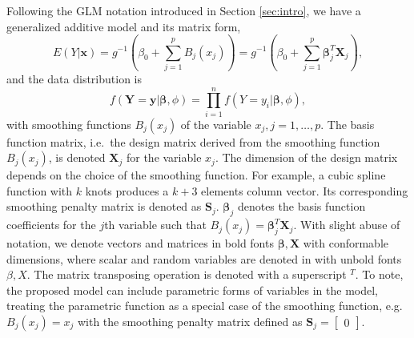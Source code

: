 \documentclass[AMA,STIX1COL,]{WileyNJD-v2}
\begin{document}
\label{sec:BHAM}

Following the GLM notation introduced in Section \ref{sec:intro}, we
have a generalized additive model and its matrix form,
\begin{equation}\label{eq:gam}
E(Y|\boldsymbol{x}) = g^{-1}(\beta_0 + \sum\limits^p_{j=1}B_j(x_j)) = g^{-1}(\beta_0 + \sum\limits^p_{j=1} \boldsymbol{\beta}_j^T \boldsymbol{X}_j),
\end{equation} and the data distribution is \begin{equation}
f(\boldsymbol{Y} = \boldsymbol{y}| \boldsymbol{\beta}, \phi) = \prod\limits^n_{i=1}f( Y = y_i|\boldsymbol{\beta}, \phi),\nonumber
\end{equation} with smoothing functions \(B_j(x_j)\) of the variable
\(x_j, j = 1, \dots, p.\) The basis function matrix, i.e.~the design
matrix derived from the smoothing function \(B_j(x_j)\), is denoted
\(\boldsymbol{X}_j\) for the variable \(x_j\). The dimension of the
design matrix depends on the choice of the smoothing function. For
example, a cubic spline function with \(k\) knots produces a \(k+3\)
elements column vector. Its corresponding smoothing penalty matrix is
denoted as \(\boldsymbol{S}_j\). \(\boldsymbol{\beta}_j\) denotes the
basis function coefficients for the \(j\)th variable such that
\(B_j(x_j) = \boldsymbol{\beta}_j^T \boldsymbol{X}_j\). With slight
abuse of notation, we denote vectors and matrices in bold fonts
\(\boldsymbol{\beta}, \boldsymbol{X}\) with conformable dimensions,
where scalar and random variables are denoted in with unbold fonts
\(\beta, X\). The matrix transposing operation is denoted with a
superscript \(^T\). To note, the proposed model can include parametric
forms of variables in the model, treating the parametric function as a
special case of the smoothing function, e.g.~\(B_j(x_j) = x_j\) with the
smoothing penalty matrix defined as
\(\boldsymbol{S}_j = \begin{bmatrix}0\end{bmatrix}\).
\end{document}
